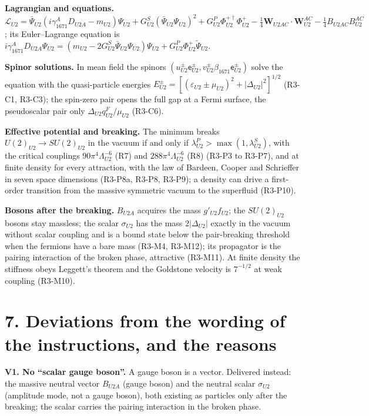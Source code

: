 \documentclass[
  10pt,
]{article}
\begin{document}
\textbf{Lagrangian and equations.}
\(\mathcal L_{U2}=\bar\Psi_{U2}(i\gamma^A_{1671}D_{U2A}-m_{U2})\Psi_{U2}+G^S_{U2}(\bar\Psi_{U2}\Psi_{U2})^2+G^P_{U2}\Phi^{+\dagger}_{U2}\Phi^+_{U2}-\tfrac14\boldsymbol W_{U2AC}\cdot\boldsymbol W^{AC}_{U2}-\tfrac14B_{U2AC}B^{AC}_{U2}\);
its Euler--Lagrange equation is
\(i\gamma^A_{1671}D_{U2A}\Psi_{U2}=(m_{U2}-2G^S_{U2}\bar\Psi_{U2}\Psi_{U2})\Psi_{U2}+G^P_{U2}\Phi^+_{U2}\tilde\Psi_{U2}\).

\textbf{Spinor solutions.} In mean field the spinors
\((u^\pm_{U2}\mathsf e^\pm_{U2},v^\pm_{U2}\beta_{1671}\mathsf e^\pm_{U2})\)
solve the equation with the quasi-particle energies
\(E^\pm_{U2}=[(\varepsilon_{U2}\pm\mu_{U2})^2+|\Delta_{U2}|^2]^{1/2}\)
(R3-C1, R3-C3); the spin-zero pair opens the full gap at a Fermi
surface, the pseudoscalar pair only \(\Delta_{U2}q^F_{U2}/\mu_{U2}\)
(R3-C6).

\textbf{Effective potential and breaking.} The minimum breaks
\(U(2)_{U2}\to SU(2)_{U2}\) in the vacuum if and only if
\(\lambda^P_{U2}>\max(1,\lambda^S_{U2})\), with the critical couplings
\(90\pi^4\Lambda^{-6}_{U2}\) (R7) and \(288\pi^4\Lambda^{-6}_{U2}\) (R8)
(R3-P3 to R3-P7), and at finite density for every attraction, with the
law of Bardeen, Cooper and Schrieffer in seven space dimensions (R3-P8a,
R3-P8, R3-P9); a density can drive a first-order transition from the
massive symmetric vacuum to the superfluid (R3-P10).

\textbf{Bosons after the breaking.} \(B_{U2A}\) acquires the mass
\(g'_{U2}f_{U2}\); the \(SU(2)_{U2}\) bosons stay massless; the scalar
\(\sigma_{U2}\) has the mass \(2|\Delta_{U2}|\) exactly in the vacuum
without scalar coupling and is a bound state below the pair-breaking
threshold when the fermions have a bare mass (R3-M4, R3-M12); its
propagator is the pairing interaction of the broken phase, attractive
(R3-M11). At finite density the stiffness obeys Leggett's theorem and
the Goldstone velocity is \(7^{-1/2}\) at weak coupling (R3-M10).

\hypertarget{deviations-from-the-wording-of-the-instructions-and-the-reasons}{%
\section{7. Deviations from the wording of the instructions, and the
reasons}\label{deviations-from-the-wording-of-the-instructions-and-the-reasons}}

\textbf{V1. No ``scalar gauge boson''.} A gauge boson is a vector.
Delivered instead: the massive neutral vector \(B_{U2A}\) (gauge boson)
and the neutral scalar \(\sigma_{U2}\) (amplitude mode, not a gauge
boson), both existing as particles only after the breaking; the scalar
carries the pairing interaction in the broken phase.
\end{document}
